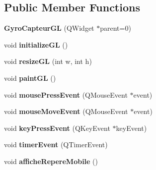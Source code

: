 \subsection*{Public Member Functions}
\begin{DoxyCompactItemize}
\item 
\hypertarget{class_gyro_capteur_g_l_a4c5728340ffe58c42f1e0e09c8135621}{{\bfseries Gyro\-Capteur\-G\-L} (Q\-Widget $\ast$parent=0)}\label{class_gyro_capteur_g_l_a4c5728340ffe58c42f1e0e09c8135621}

\item 
\hypertarget{class_gyro_capteur_g_l_af8803344f26c25f6ec9df77e67f0419f}{void {\bfseries initialize\-G\-L} ()}\label{class_gyro_capteur_g_l_af8803344f26c25f6ec9df77e67f0419f}

\item 
\hypertarget{class_gyro_capteur_g_l_a6fbf4b254f5309ee0680779cdd3d88f0}{void {\bfseries resize\-G\-L} (int w, int h)}\label{class_gyro_capteur_g_l_a6fbf4b254f5309ee0680779cdd3d88f0}

\item 
\hypertarget{class_gyro_capteur_g_l_aee39596ac4e47328a01cd84dba1ccd72}{void {\bfseries paint\-G\-L} ()}\label{class_gyro_capteur_g_l_aee39596ac4e47328a01cd84dba1ccd72}

\item 
\hypertarget{class_gyro_capteur_g_l_a252d79155f2fc8ae53e8cf3aa17c4e5c}{void {\bfseries mouse\-Press\-Event} (Q\-Mouse\-Event $\ast$event)}\label{class_gyro_capteur_g_l_a252d79155f2fc8ae53e8cf3aa17c4e5c}

\item 
\hypertarget{class_gyro_capteur_g_l_a5d2eb8df9949ff611a044279de26799f}{void {\bfseries mouse\-Move\-Event} (Q\-Mouse\-Event $\ast$event)}\label{class_gyro_capteur_g_l_a5d2eb8df9949ff611a044279de26799f}

\item 
\hypertarget{class_gyro_capteur_g_l_ac1fb37ea24009c3a9aba407519a861b9}{void {\bfseries key\-Press\-Event} (Q\-Key\-Event $\ast$key\-Event)}\label{class_gyro_capteur_g_l_ac1fb37ea24009c3a9aba407519a861b9}

\item 
\hypertarget{class_gyro_capteur_g_l_a9272fba7e3d12ffc34c536845146df47}{void {\bfseries timer\-Event} (Q\-Timer\-Event)}\label{class_gyro_capteur_g_l_a9272fba7e3d12ffc34c536845146df47}

\item 
\hypertarget{class_gyro_capteur_g_l_ac17e9696af988dcea1e103d24d9f427a}{void {\bfseries affiche\-Repere\-Mobile} ()}\label{class_gyro_capteur_g_l_ac17e9696af988dcea1e103d24d9f427a}


\end{DoxyCompactItemize}
